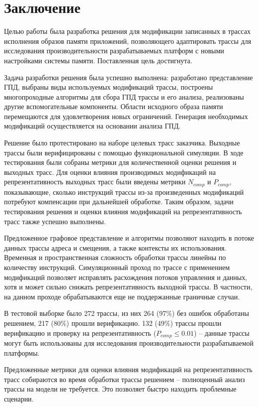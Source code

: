 \section{Заключение}

Целью работы была разработка решения для модификации записанных в трассах исполнения образов памяти приложений, позволяющего адаптировать трассы для исследования производительности разрабатываемых платформ с новыми настройками системы памяти. Поставленная цель достигнута.

Задача разработки решения была успешно выполнена: разработано представление ГПД, выбраны виды используемых модификаций трассы, построены многопроходные алгоритмы для сбора ГПД трассы и его анализа, реализованы другие вспомогательные компоненты. Области исходного образа памяти перемещаются для удовлетворения новых ограничений. Генерация необходимых модификаций осуществляется на основании анализа ГПД.

Решение было протестировано на наборе целевых трасс заказчика. Выходные трассы были верифицированы с помощью функциональной симуляции. В ходе тестирования были собраны метрики для количественной оценки решения и выходных трасс. Для оценки влияния производимых модификаций на репрезентативность выходных трасс были введены метрики $N_{comp}$ и $P_{comp}$, показывающие, сколько инструкций трассы из-за произведенных модификаций потребуют компенсации при дальнейшей обработке. Таким образом, задачи тестирования решения и оценки влияния модификаций на репрезентативность трасс также успешно выполнены.

Предложенное графовое представление и алгоритмы позволяют находить в потоке данных трассы адреса и смещения, а также контексты их использования. Временная и пространственная сложность обработки трассы линейны по количеству инструкций. Симуляционный проход по трассе с применением модификаций позволяет исправлять расхождения потоков управления и данных, хотя и может сильно снижать репрезентативность выходной трассы. В частности, на данном проходе обрабатываются еще не поддержанные граничные случаи.

В тестовой выборке было 272 трассы, из них 264 (97\%) без ошибок обработаны решением, 217 (80\%) прошли верификацию. 132 (49\%) трассы прошли верификацию и проверку на репрезентативность ($P_{comp} \leq 0.01$) -- данные трассы могут быть использованы для исследования производительности разрабатываемой платформы.

Предложенные метрики для оценки влияния модификаций на репрезентативность трасс собираются во время обработки трассы решением -- полноценный анализ трассы на модели не требуется. Это позволяет быстро находить проблемные сценарии.

